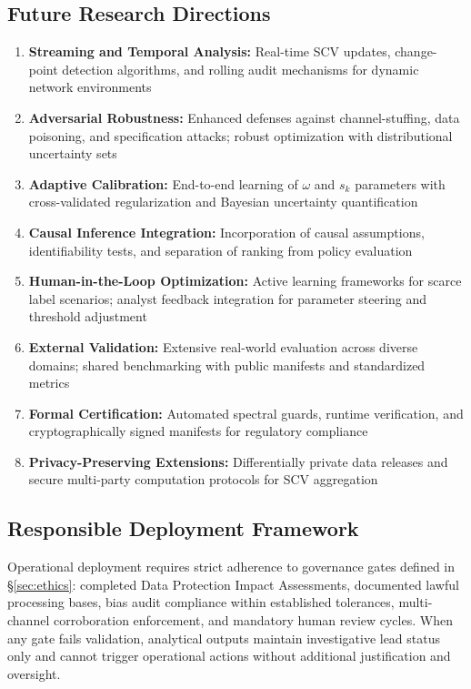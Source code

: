 \documentclass[12pt]{article}
\theoremstyle{plain}
\begin{document}
\subsection{Future Research Directions}
\begin{enumerate}\itemsep0.2em
\item \textbf{Streaming and Temporal Analysis:} Real-time SCV updates, change-point detection algorithms, and rolling audit mechanisms for dynamic network environments
\item \textbf{Adversarial Robustness:} Enhanced defenses against channel-stuffing, data poisoning, and specification attacks; robust optimization with distributional uncertainty sets
\item \textbf{Adaptive Calibration:} End-to-end learning of $\omega$ and $s_k$ parameters with cross-validated regularization and Bayesian uncertainty quantification
\item \textbf{Causal Inference Integration:} Incorporation of causal assumptions, identifiability tests, and separation of ranking from policy evaluation
\item \textbf{Human-in-the-Loop Optimization:} Active learning frameworks for scarce label scenarios; analyst feedback integration for parameter steering and threshold adjustment
\item \textbf{External Validation:} Extensive real-world evaluation across diverse domains; shared benchmarking with public manifests and standardized metrics
\item \textbf{Formal Certification:} Automated spectral guards, runtime verification, and cryptographically signed manifests for regulatory compliance
\item \textbf{Privacy-Preserving Extensions:} Differentially private data releases and secure multi-party computation protocols for SCV aggregation
\end{enumerate}

\subsection{Responsible Deployment Framework}
Operational deployment requires strict adherence to governance gates defined in §\ref{sec:ethics}: completed Data Protection Impact Assessments, documented lawful processing bases, bias audit compliance within established tolerances, multi-channel corroboration enforcement, and mandatory human review cycles. When any gate fails validation, analytical outputs maintain investigative lead status only and cannot trigger operational actions without additional justification and oversight.
\end{document}
